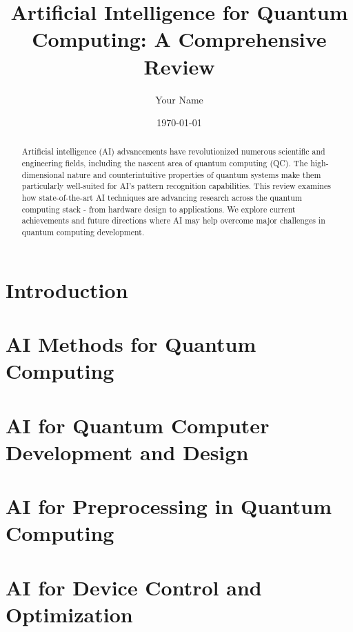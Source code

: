 \documentclass[twocolumn,pra,superscriptaddress,nofootinbib]{revtex4-2}
\begin{document}
\title{Artificial Intelligence for Quantum Computing: A Comprehensive Review}

\author{Your Name}

\date{\today}

\begin{abstract}
Artificial intelligence (AI) advancements have revolutionized numerous scientific and engineering fields, including the nascent area of quantum computing (QC). The high-dimensional nature and counterintuitive properties of quantum systems make them particularly well-suited for AI's pattern recognition capabilities. This review examines how state-of-the-art AI techniques are advancing research across the quantum computing stack - from hardware design to applications. We explore current achievements and future directions where AI may help overcome major challenges in quantum computing development.
\end{abstract}

\maketitle

\section{Introduction}


\section{AI Methods for Quantum Computing}


\section{AI for Quantum Computer Development and Design}


\section{AI for Preprocessing in Quantum Computing}


\section{AI for Device Control and Optimization}

\end{document}
